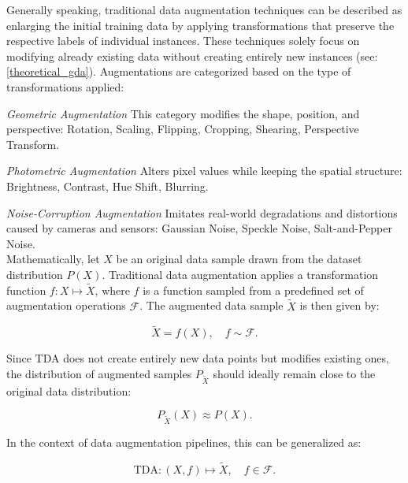 Generally speaking, traditional data augmentation techniques can be described as enlarging the initial training data by applying transformations that preserve the respective labels of individual instances. These techniques solely focus on modifying already existing data without creating entirely new instances (see: \ref{theoretical_gda}). Augmentations are categorized based on the type of transformations applied:

\noindent\textit{Geometric Augmentation}
This category modifies the shape, position, and perspective: Rotation, Scaling, Flipping, Cropping, Shearing, Perspective Transform.

\noindent\textit{Photometric Augmentation}
Alters pixel values while keeping the spatial structure: Brightness, Contrast, Hue Shift, Blurring.

\noindent\textit{Noise-Corruption Augmentation}
Imitates real-world degradations and distortions caused by cameras and sensors: Gaussian Noise, Speckle Noise, Salt-and-Pepper Noise.\\

Mathematically, let \( X \) be an original data sample drawn from the dataset distribution \( P(X) \). Traditional data augmentation applies a transformation function \( f: X \mapsto \tilde{X} \), where \( f \) is a function sampled from a predefined set of augmentation operations \( \mathcal{F} \). The augmented data sample \( \tilde{X} \) is then given by:

\[
\tilde{X} = f(X), \quad f \sim \mathcal{F}.
\]

Since TDA does not create entirely new data points but modifies existing ones, the distribution of augmented samples \( P_{\tilde{X}} \) should ideally remain close to the original data distribution:

\[
P_{\tilde{X}}(X) \approx P(X).
\]

In the context of data augmentation pipelines, this can be generalized as:

\[
\text{TDA}: (X, f) \mapsto \tilde{X}, \quad f \in \mathcal{F}.
\]

